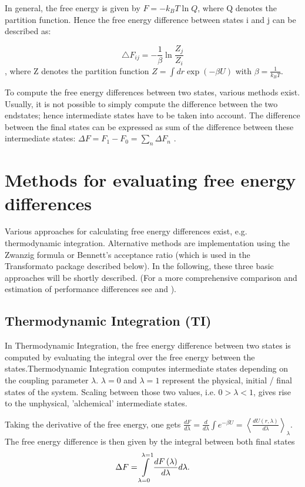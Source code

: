 In general, the free energy is given by $F=-k_{B}T\ln Q$, where Q
denotes the partition function. Hence the free energy difference between
states i and j can be described as:

\[
\bigtriangleup F_{ij}=-\frac{1}{\beta}\ln\frac{Z_{j}}{Z_{i}}
\]
, where Z denotes the partition function $Z=\int dr\exp\left(-\beta U\right)$
with $\beta=\frac{1}{k_{B}T}$\cite{Shirts.2013}. 

To compute the free energy differences between two states, various
methods exist. Usually, it is not possible to simply compute the difference
between the two endstates; hence intermediate states have to be taken
into account. The difference between the final states can be expressed
as sum of the difference between these intermediate states: $\Delta F=F_{1}-F_{0}=\sum_{n}\Delta F_{n}$
\cite{Mey.2020}.

\section{Methods for evaluating free energy differences}

Various approaches for calculating free energy differences exist,
e.g. thermodynamic integration. Alternative methods are implementation
using the Zwanzig formula or Bennett's acceptance ratio (which is
used in the Transformato package described below). In the following,
these three basic approaches will be shortly described. (For a more
comprehensive comparison and estimation of performance differences
see \cite{Bruckner.2011} and \cite{Ruiter.2013}).

\subsection{Thermodynamic Integration (TI)}

In Thermodynamic Integration, the free energy difference between two
states is computed by evaluating the integral over the free energy
between the states.Thermodynamic Integration computes intermediate
states depending on the coupling parameter $\lambda$. $\lambda=0$
and $\lambda=1$ represent the physical, initial / final states of
the system. Scaling between those two values, i.e. $0>\lambda<1$,
gives rise to the unphysical, 'alchemical' intermediate states.

Taking the derivative of the free energy, one gets $\frac{dF}{d\lambda}=\frac{d}{d\lambda}\int e^{-\beta U}=\left\langle \frac{dU\left(r,\lambda\right)}{d\lambda}\right\rangle _{\lambda}$\cite{Shirts.2013}.
The free energy difference is then given by the integral between both
final states 
\[
\Delta F=\intop_{\lambda=0}^{\lambda=1}\frac{dF\left(\lambda\right)}{d\lambda}d\lambda.
\]

